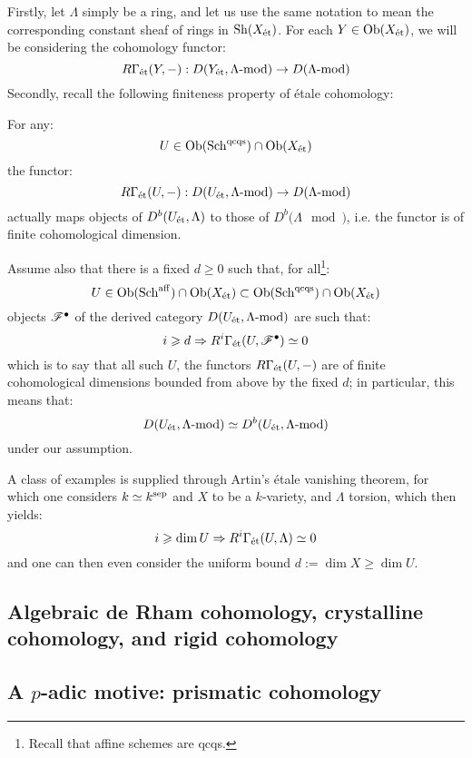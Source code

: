             Firstly, let $\Lambda$ simply be a ring, and let us use the same notation to mean the corresponding constant sheaf of rings in $\mathrm{Sh}(X_{\mathrm{\acute{e}t}})$. For each $Y \in \mathrm{Ob}(X_{\mathrm{\acute{e}t}})$, we will be considering the cohomology functor:
                $$R\Gamma_{\mathrm{\acute{e}t}}(Y, -): D(Y_{\mathrm{\acute{e}t}}, \Lambda\text{-}\mathrm{mod}) \to D(\Lambda\text{-}\mathrm{mod})$$
            Secondly, recall the following finiteness property of \'etale cohomology:
            \begin{lemma} \label{lemma: finiteness_of_etale_cohomology}
                \cite[Lemma 6.4.2]{bhatt_scholze_2014_pro_etale} For any:
                    $$U \in \mathrm{Ob}(\mathrm{Sch}^{\mathrm{qc}\mathrm{qs}}) \cap \mathrm{Ob}(X_{\mathrm{\acute{e}t}})$$
                the functor:
                    $$R\Gamma_{\mathrm{\acute{e}t}}(U, -): D(U_{\mathrm{\acute{e}t}}, \Lambda\text{-}\mathrm{mod}) \to D(\Lambda\text{-}\mathrm{mod})$$
                actually maps objects of $D^b(U_{\mathrm{\acute{e}t}}, \Lambda)$ to those of $D^b(\Lambda\mod)$, i.e. the functor is of finite cohomological dimension.
            \end{lemma}

            \begin{convention}
                Assume also that there is a fixed $d \geq 0$ such that, for all\footnote{Recall that affine schemes are qcqs.}:
                    $$U \in \mathrm{Ob}(\mathrm{Sch}^{\mathrm{aff}}) \cap \mathrm{Ob}(X_{\mathrm{\acute{e}t}}) \subset \mathrm{Ob}(\mathrm{Sch}^{\mathrm{qc}\mathrm{qs}}) \cap \mathrm{Ob}(X_{\mathrm{\acute{e}t}})$$
                objects $\mathscr{F}^{\bullet}$ of the derived category $D(U_{\mathrm{\acute{e}t}}, \Lambda\text{-}\mathrm{mod})$ are such that:
                    $$i \geqslant d \Rightarrow R^i\Gamma_{\mathrm{\acute{e}t}}(U, \mathscr{F}^{\bullet}) \simeq 0$$
                which is to say that all such $U$, the functors $R\Gamma_{\mathrm{\acute{e}t}}(U, -)$ are of finite cohomological dimensions bounded from above by the fixed $d$; in particular, this means that:
                    $$D(U_{\mathrm{\acute{e}t}}, \Lambda\text{-}\mathrm{mod}) \simeq D^b(U_{\mathrm{\acute{e}t}}, \Lambda\text{-}\mathrm{mod})$$
                under our assumption. 
            \end{convention}
        
            \begin{example}
                A class of examples is supplied through Artin's \'etale vanishing theorem, for which one considers $k \simeq k^{\mathrm{sep}}$ and $X$ to be a $k$-variety, and $\Lambda$ torsion, which then yields:
                    $$i \geqslant \dim U \Rightarrow R^i\Gamma_{\mathrm{\acute{e}t}}(U, \Lambda) \simeq 0$$
                and one can then even consider the uniform bound $d := \dim X \geq \dim U$.
            \end{example}

        \subsection{Algebraic de Rham cohomology, crystalline cohomology, and rigid cohomology}

        \subsection{A \texorpdfstring{$p$}{}-adic motive: prismatic cohomology}
    
    \printbibliography

